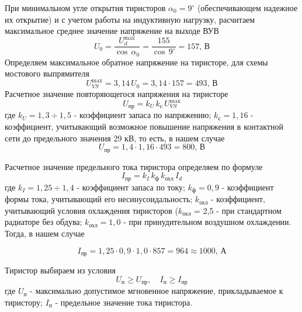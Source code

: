 При минимальном угле открытия тиристоров $\alpha_0 = 9^\circ$ (обеспечивающем надежное их открытие) и с учетом работы на индуктивную нагрузку, расчитаем максимальное среднее значение напряжение на выходе ВУВ
\begin{equation*}
 U_0 = \frac{U_d^{\max}}{\cos \, \alpha_0} = \frac{155}{\cos \, 9^{\circ}} = 157, \, \text{В}
\end{equation*}
Определяем максимальное обратное напряжение на тиристоре, для схемы мостового выпрямителя
\begin{equation*}
 U_{VS}^{\max} = 3,14 \, U_0 = 3,14 \cdot 157 = 493, \, \text{В}
\end{equation*}
Расчетное значение повторяющегося напряжения на тиристоре
\begin{equation*}
 U_{\text{пр}} = k_{U} \, k_{\text{с}} \, U_{VS}^{\max} 
\end{equation*}
где $k_{U} = 1,3 \div 1,5$ - коэффициент запаса по напряжению; $k_{\text{с}} = 1,16$ - коэффициент, учитывающий возможное повышение напряжения в контактной сети до предельного значения 29 кВ, то есть, в нашем случае
\begin{equation*}
 U_{\text{пр}} = 1,4 \cdot 1,16 \cdot 493 = 800, \, \text{В} 
\end{equation*}

Расчетное значение предельного тока тиристора определяем по формуле
\begin{equation*}
 I_{\text{пр}} = k_I \, k_{\text{ф}} \, k_{\text{охл}} \, I_d
\end{equation*}
где $k_I = 1,25 \div 1,4$ - коэффициент запаса по току; $k_{\text{ф}} = 0,9$ - коэффициент формы тока, учитывающий его несинусоидальность; $k_{\text{охл}}$ - коэффициент, учитывающий условия охлаждения тиристоров ($k_{\text{охл}}$ = 2,5 - при стандартном радиаторе без обдува; $k_{\text{охл}} = 1,0$ - при принудительном воздушном охлаждении. Тогда, в нашем случае

\begin{equation*}
 I_{\text{пр}} = 1,25 \cdot 0,9 \cdot 1,0 \cdot 857 = 964 \approx 1000, \, \text{А}
\end{equation*}

Тиристор выбираем из условия 
\begin{equation*}
 U_{\text{п}} \ge U_{\text{пр}}, \quad I_{\text{п}} \ge I_{\text{пр}}
\end{equation*}
где $U_{\text{п}}$ - максимально допустимое мгновенное напряжение, прикладываемое к тиристору; $I_{\text{п}}$ - предельное значение тока тиристора.

